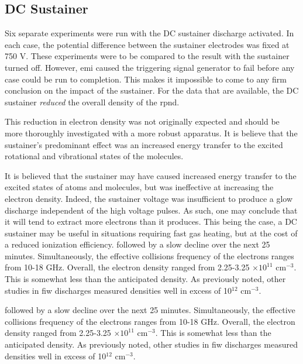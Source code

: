 \subsection{DC Sustainer}

Six separate experiments were run with the DC sustainer discharge activated. In
each case, the potential difference between the sustainer electrodes was fixed
at 750 V. These experiments were to be compared to the result with the sustainer
turned off. However, \acs{emi} caused the triggering signal generator to fail
before any case could be run to completion. This makes it impossible to come to
any firm conclusion on the impact of the sustainer. For the data that are
available, the DC sustainer \emph{reduced} the overall density of the
\acs{rpnd}.

This reduction in electron density was not originally expected and should be
more thoroughly investigated with a more robust apparatus. It is believe that
the sustainer's predominant effect was an increased energy transfer to the
excited rotational and vibrational states of the molecules.

It is believed that the sustainer may have caused increased energy transfer to
the excited states of atoms and molecules, but was ineffective at increasing the
electron density. Indeed, the sustainer voltage was insufficient to produce a
glow discharge independent of the high voltage pulses. As such, one may conclude
that it will tend to extract more electrons than it produces. This being the
case, a DC sustainer may be useful in situations requiring fast gas heating, but
at the cost of a reduced ionization efficiency. followed by a slow decline over
the next 25 minutes. Simultaneously, the effective collisions frequency of the
electrons ranges from 10-18 GHz. Overall, the electron density ranged from
2.25-3.25 $\times10^{11}$ cm$^{-3}$. This is somewhat less than the anticipated
density. As previously noted, other studies in \acs{fiw} discharges
\cite{Aleksandrov2007, Pancheshnyi1999, Macheret2006} measured densities well in
excess of 10$^{12}$ cm$^{-3}$.

followed by a slow decline over the next 25 minutes. Simultaneously, the
effective collisions frequency of the electrons ranges from 10-18 GHz. Overall,
the electron density ranged from 2.25-3.25 $\times10^{11}$ cm$^{-3}$. This is
somewhat less than the anticipated density. As previously noted, other studies
in \acs{fiw} discharges \cite{Aleksandrov2007, Pancheshnyi1999, Macheret2006}
measured densities well in excess of 10$^{12}$ cm$^{-3}$.


